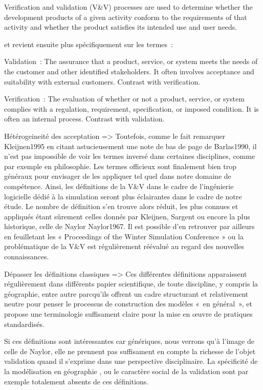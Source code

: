 Verification and validation (V\&V) processes are used to determine whether the development products of a given activity conform to the requirements of that activity and whether the product satisfies its intended use and user needs. 

et revient ensuite plus spécifiquement sur les termes : 

Validation : The assurance that a product, service, or system meets the needs of the customer and other identified stakeholders. It often involves acceptance and suitability with external customers. Contrast with verification.

Verification : The evaluation of whether or not a product, service, or system complies with a regulation, requirement, specification, or imposed condition. It is often an internal process. Contrast with validation.

Hétérogeineité des acceptation => Toutefois, comme le fait remarquer {Kleijnen1995} en citant astucieusement une note de bas de page de {Barlas1990}, il n'est pas impossible de voir les termes inversé dans certaines disciplines, comme par exemple en philosophie. Les termes officieux sont finalement bien trop généraux pour envisager de les appliquer tel quel dans notre domaine de compétence. Ainsi, les définitions de la V\&V dans le cadre de l'ingénierie logicielle dédié à la simulation seront plus éclairantes dans le cadre de notre étude. Le nombre de définition s'en trouve alors réduit, les plus connues et appliqués étant sûrement celles donnés par Kleijnen, Sargent ou encore la plus historique, celle de Naylor {Naylor1967}. Il est possible d'en retrouver par ailleurs en feuilletant les « Proceedings of the Winter Simulation Conference » ou la problématique de la V&V est régulièrement réévalué au regard des nouvelles connaissances. 



Dépasser les définitions classiques => Ces différentes définitions apparaissent régulièrement dans différents papier scientifique, de toute discipline, y compris la géographie, entre autre parcqu'ils offrent un cadre structurant et relativement neutre pour penser le processus de construction des modèles « en général », et propose une terminologie suffisament claire pour la mise en œuvre de pratiques standardisés. 

Si ces définitions sont intéressantes car génériques, nous verrons qu'à l'image de celle de Naylor, elle ne prennent pas suffisament en compte la richesse de l'objet validation quand il s'exprime dans une perspective disciplinaire. La spécificité de la modélisation en géographie , ou le caractère social de la validation sont par exemple totalement absents de ces définitions. 

